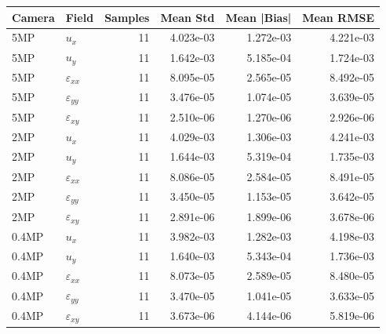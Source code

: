 \begin{tabular}{llrrrr}
\toprule
Camera & Field & Samples & Mean Std & Mean |Bias| & Mean RMSE \\
\midrule
5MP & $u_x$ & 11 & 4.023e-03 & 1.272e-03 & 4.221e-03 \\
5MP & $u_y$ & 11 & 1.642e-03 & 5.185e-04 & 1.724e-03 \\
5MP & $\varepsilon_{xx}$ & 11 & 8.095e-05 & 2.565e-05 & 8.492e-05 \\
5MP & $\varepsilon_{yy}$ & 11 & 3.476e-05 & 1.074e-05 & 3.639e-05 \\
5MP & $\varepsilon_{xy}$ & 11 & 2.510e-06 & 1.270e-06 & 2.926e-06 \\
2MP & $u_x$ & 11 & 4.029e-03 & 1.306e-03 & 4.241e-03 \\
2MP & $u_y$ & 11 & 1.644e-03 & 5.319e-04 & 1.735e-03 \\
2MP & $\varepsilon_{xx}$ & 11 & 8.086e-05 & 2.584e-05 & 8.491e-05 \\
2MP & $\varepsilon_{yy}$ & 11 & 3.450e-05 & 1.153e-05 & 3.642e-05 \\
2MP & $\varepsilon_{xy}$ & 11 & 2.891e-06 & 1.899e-06 & 3.678e-06 \\
0.4MP & $u_x$ & 11 & 3.982e-03 & 1.282e-03 & 4.198e-03 \\
0.4MP & $u_y$ & 11 & 1.640e-03 & 5.343e-04 & 1.736e-03 \\
0.4MP & $\varepsilon_{xx}$ & 11 & 8.073e-05 & 2.589e-05 & 8.480e-05 \\
0.4MP & $\varepsilon_{yy}$ & 11 & 3.470e-05 & 1.041e-05 & 3.633e-05 \\
0.4MP & $\varepsilon_{xy}$ & 11 & 3.673e-06 & 4.144e-06 & 5.819e-06 \\
\bottomrule
\end{tabular}
